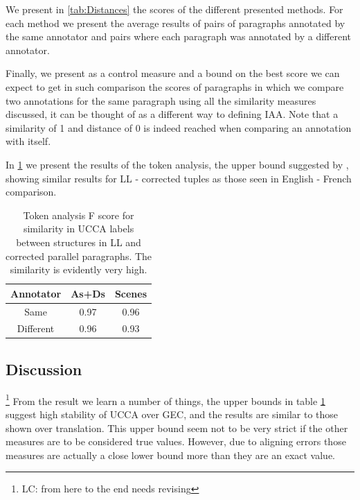 \documentclass[letter,11pt]{article}
\newcommand{\lc}[1]{\footnote{\color{green}LC: #1}}
\begin{document}
	We present in \ref{tab:Distances} the scores of the different presented
	methods. For each method we present the average results of pairs
	of paragraphs annotated by the same annotator and pairs where each
	paragraph was annotated by a different annotator.
	
	Finally, we present as a control measure and a bound on the best score
	we can expect to get in such comparison the scores of paragraphs
	in which we compare two annotations for the same paragraph using all
	the similarity measures discussed, it can be thought of as a different
	way to defining IAA. Note that a similarity
	of 1 and distance of 0 is indeed reached when comparing an annotation with itself.
	
	In \ref{tab:Token_analysis} we present the results of the token analysis, the
	upper bound suggested by \cite{sulem2015conceptual}, showing similar
	results for LL - corrected tuples as those seen in English
	- French comparison.
\vspace*{-\baselineskip}
		\begin{table}[h!]
			\centering
			\begin{tabular}{c|c|c}
				Annotator& As+Ds & Scenes\\
				\hline
				Same  & 0.97 & 0.96\\
				Different & 0.96
				 & 0.93
				 \\
				\end{tabular}
				\caption{Token analysis F score for similarity in UCCA labels between structures in LL and corrected parallel paragraphs. The similarity is evidently very high.\label{tab:Token_analysis}}
				\end{table}
				
	\subsection{Discussion}
		\lc{from here to the end needs revising}
	From the result we learn a number of things, the upper
	bounds in table \ref{tab:Token_analysis} suggest high stability of UCCA over GEC, and the results are similar to those shown over
	translation. This upper bound seem not to be very strict if the other
	measures are to be considered true values. 
	However, due to aligning errors those measures are actually a close lower bound more than they are an exact value.
	
\end{document}
